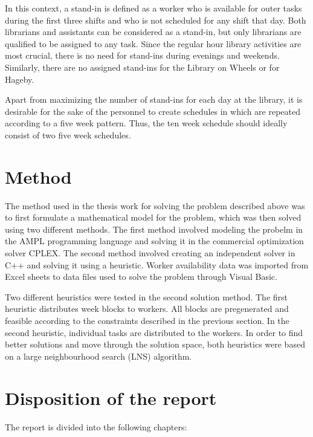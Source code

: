 In this context, a stand-in is defined as a worker who is available for outer tasks during the first three shifts and who is not scheduled for any shift that day. Both librarians and assistants can be considered as a stand-in, but only librarians are qualified to be assigned to any task. Since the regular hour library activities are most crucial, there is no need for stand-ins during evenings and weekends. Similarly, there are no assigned stand-ins for the Library on Wheels or for Hageby.

Apart from maximizing the number of stand-ins for each day at the library, it is desirable for the sake of the personnel to create schedules in which are repeated according to a five week pattern. Thus, the ten week schedule should ideally consist of two five week schedules. 

\section{Method}
The method used in the thesis work for solving the problem described above was to first formulate a mathematical model for the problem, which was then solved using two different methods. The first method involved modeling the probelm in the AMPL programming language and solving it in the commercial optimization solver CPLEX. The second method involved creating an independent solver in C++ and solving it using a heuristic. Worker availability data was imported from Excel sheets to data files used to solve the problem through Visual Basic.

Two different heuristics were tested in the second solution method. The first heuristic distributes week blocks to workers. All blocks are pregenerated and feasible according to the constraints described in the previous section. In the second heuristic, individual tasks are distributed to the workers. In order to find better solutions and move through the solution space, both heuristics were based on a large neighbourhood search (LNS) algorithm.

\section{Disposition of the report}

The report is divided into the following chapters:

